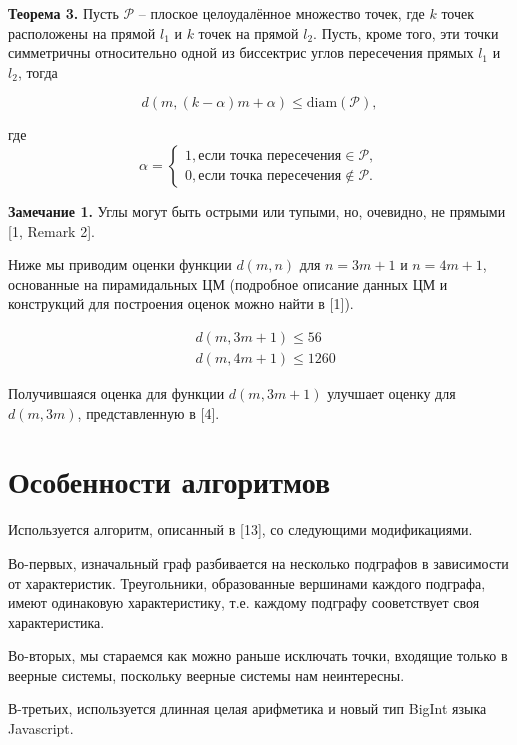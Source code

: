 \documentclass[12pt]{article}
\begin{document}
\par
\textbf{Теорема 3.}
Пусть $\mathcal{P}$ -- плоское целоудалённое множество точек, где
$k$ точек расположены на прямой $l_{1}$ и $k$ точек на прямой $l_{2}$.
Пусть, кроме того, эти точки симметричны относительно одной из биссектрис углов пересечения
прямых $l_{1}$ и $l_{2}$, тогда

\begin{equation}
d(m, (k - \alpha)m + \alpha) \leq \operatorname{diam(\mathcal{P})},
\end{equation}

где
\begin{equation*}
\alpha =
\begin{cases}
1, \text{если точка пересечения} \in \mathcal{P}, \\
0, \text{если точка пересечения} \notin \mathcal{P}.
\end{cases}
\end{equation*}

\par
\textbf{Замечание 1.}
Углы могут быть острыми или тупыми, но, очевидно, не прямыми [1, Remark 2].

Ниже мы приводим оценки функции $d(m, n)$ для $n = 3m + 1$ и $n = 4m + 1$, основанные на пирамидальных ЦМ (подробное описание данных ЦМ и конструкций для построения оценок можно найти в [1]).

\begin{align}
&d(m, 3m + 1) \leq 56 \\
&d(m, 4m + 1) \leq 1260
\end{align}

Получившаяся оценка для функции $d(m, 3m + 1)$ улучшает оценку для $d(m, 3m)$, представленную в [4].

\section{Особенности алгоритмов}
Используется алгоритм, описанный в [13], со следующими модификациями.

Во-первых, изначальный граф разбивается на несколько подграфов в зависимости от характеристик.
Треугольники, образованные вершинами каждого подграфа, имеют одинаковую характеристику,
т.е. каждому подграфу сооветствует своя характеристика.

Во-вторых, мы стараемся как можно раньше исключать точки, входящие только в веерные системы, поскольку веерные системы
нам неинтересны.

В-третьих, используется длинная целая арифметика и новый тип BigInt языка Javascript.
\end{document}
